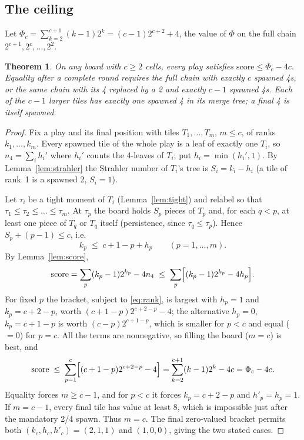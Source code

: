 \documentclass[11pt]{article}
\newtheorem{theorem}{Theorem}
\theoremstyle{definition}
\theoremstyle{remark}
\newcommand{\Phichain}{\Phi}
\newcommand{\nfour}{n_4}
\begin{document}
\subsection{The ceiling}

Let $\Phi_c=\sum_{k=2}^{c+1}(k-1)2^k=(c-1)2^{c+2}+4$, the value of
$\Phichain$ on the full chain $2^{c+1},2^c,\dots,2^2$.

\begin{theorem}\label{thm:score}
On any board with $c\ge2$ cells, every play satisfies
$\mathrm{score}\le\Phi_c-4c$. Equality after a complete round requires
the full chain with exactly $c$ spawned 4s, or the same chain with its
4 replaced by a 2 and exactly $c-1$ spawned 4s. Each of the $c-1$ larger
tiles has exactly one spawned 4 in its merge tree; a final 4 is itself
spawned.
\end{theorem}
\begin{proof}
Fix a play and its final position with tiles $T_1,\dots,T_m$, $m\le c$, of
ranks $k_1,\dots,k_m$. Every spawned tile of the whole play is a leaf of
exactly one $T_i$, so $\nfour=\sum_i h_i'$ where $h_i'$ counts the 4-leaves
of $T_i$; put $h_i=\min(h_i',1)$. By Lemma~\ref{lem:strahler} the Strahler
number of $T_i$'s tree is $S_i=k_i-h_i$ (a tile of rank~1 is a spawned 2,
$S_i=1$).

Let $\tau_i$ be a tight moment of $T_i$ (Lemma~\ref{lem:tight}) and
relabel so that $\tau_1\le\tau_2\le\dots\le\tau_m$. At $\tau_p$ the board
holds $S_p$ pieces of $T_p$ and, for each $q<p$, at least one piece of
$T_q$ or $T_q$ itself (persistence, since $\tau_q\le\tau_p$). Hence
$S_p+(p-1)\le c$, i.e.
\begin{equation}\label{eq:rank}
k_p\;\le\;c+1-p+h_p\qquad(p=1,\dots,m).
\end{equation}
By Lemma~\ref{lem:score},
\[
\mathrm{score}=\sum_{p}(k_p-1)2^{k_p}-4\nfour\;\le\;\sum_{p}\Bigl[(k_p-1)2^{k_p}-4h_p\Bigr].
\]
For fixed $p$ the bracket, subject to \eqref{eq:rank}, is largest with
$h_p=1$ and $k_p=c+2-p$, worth $(c+1-p)2^{c+2-p}-4$; the alternative
$h_p=0$, $k_p=c+1-p$ is worth $(c-p)2^{c+1-p}$, which is smaller for $p<c$
and equal ($=0$) for $p=c$. All the terms are nonnegative, so filling the
board ($m=c$) is best, and
\[
\mathrm{score}\;\le\;\sum_{p=1}^{c}\Bigl[(c+1-p)2^{c+2-p}-4\Bigr]
=\sum_{k=2}^{c+1}(k-1)2^k-4c=\Phi_c-4c.
\]
Equality forces $m\ge c-1$, and for $p<c$ it forces $k_p=c+2-p$
and $h'_p=h_p=1$. If $m=c-1$, every final tile has value at least 8,
which is impossible just after the mandatory 2/4 spawn. Thus $m=c$.
The final zero-valued bracket permits both
$(k_c,h_c,h'_c)=(2,1,1)$ and $(1,0,0)$, giving the two stated cases.
\end{proof}
\end{document}
